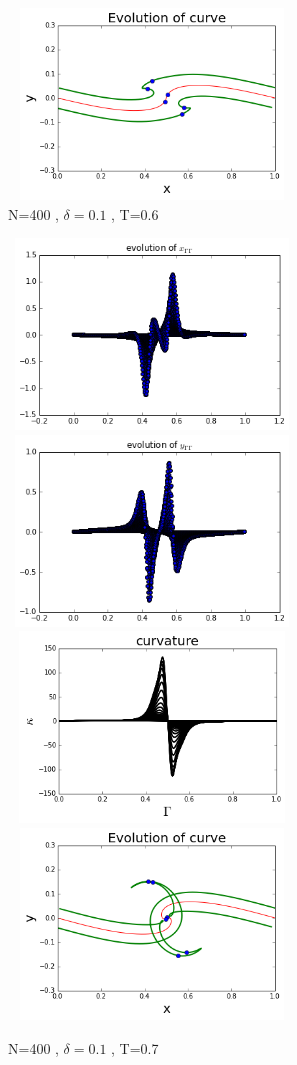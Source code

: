 \documentclass[12pt,twoside]{article}
\begin{document}
\begin{figure}[ht]
\begin{minipage}[b]{0.45\linewidth}
\includegraphics[width=3in,height=2in]{curveT06.png}
\caption{N=400 , $\delta=0.1$ , T=0.6}

\end{minipage}
\end{figure}


\begin{figure}[ht]
\centering
\begin{minipage}[b]{0.45\linewidth}
\includegraphics[width=3in,height=2in]{xppT07.png}
\includegraphics[width=3in,height=2in]{yppT07.png}
\includegraphics[width=3in,height=2in]{curvatureT07.png}
\includegraphics[width=3in,height=2in]{curveT07.png}
\caption{N=400 , $\delta=0.1$ , T=0.7}


\end{minipage}
\end{figure}
\end{document}
